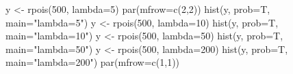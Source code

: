 \begin{Schunk}
\begin{Sinput}
 y <- rpois(500, lambda=5)
 par(mfrow=c(2,2))
 hist(y, prob=T, main="lambda=5")
 y <- rpois(500, lambda=10)
 hist(y, prob=T, main="lambda=10")
 y <- rpois(500, lambda=50)
 hist(y, prob=T, main="lambda=50")
 y <- rpois(500, lambda=200)
 hist(y, prob=T, main="lambda=200")
 par(mfrow=c(1,1))
\end{Sinput}
\end{Schunk}
